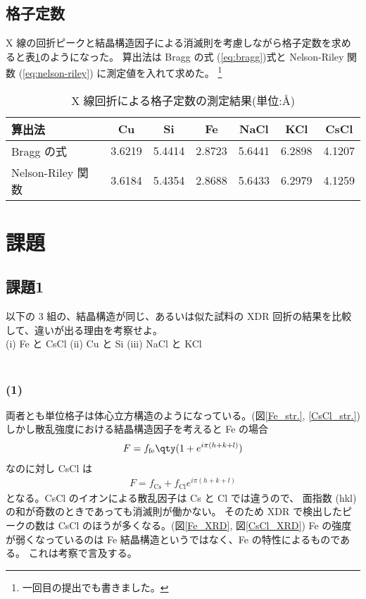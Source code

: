 \documentclass[11pt,dvipdfmx,a4paper]{jsarticle}
\begin{document}
\subsection{格子定数}
X 線の回折ピークと結晶構造因子による消滅則を考慮しながら格子定数を求めると表\ref{table:result}のようになった。
算出法は Bragg の式 (\ref{eq:bragg})式と Nelson-Riley 関数 (\ref{eq:nelson-riley}) に測定値を入れて求めた。
\footnote{一回目の提出でも書きました。}
\begin{table}[H]
	\centering
	\caption{X 線回折による格子定数の測定結果(単位:\AA)} \label{table:result}
	\begin{tabular}[pos]{lcccccc}
		\hline \hline
		算出法 & Cu & Si & Fe & NaCl & KCl & CsCl \\
		\hline
		Bragg の式 & 3.6219 & 5.4414 & 2.8723 & 5.6441 & 6.2898 & 4.1207 \\
		Nelson-Riley 関数 & 3.6184 & 5.4354 & 2.8688 & 5.6433 & 6.2979 & 4.1259\\
		\hline \hline
	\end{tabular}
\end{table}

\section{課題}
\subsection*{課題1}
以下の 3 組の、結晶構造が同じ、あるいは似た試料の XDR 回折の結果を比較して、違いが出る理由を考察せよ。\\
(i) Fe と CsCl \quad (ii) Cu と Si \quad (iii) NaCl と KCl\\ \\

\subsubsection*{(1)}
両者とも単位格子は体心立方構造のようになっている。(図\ref{Fe_str.}, \ref{CsCl_str.})
しかし散乱強度における結晶構造因子を考えると Fe の場合
\begin{align}
	F = f_{\text{fe}}\qty(1+e^{i\pi(h+k+l)})
\end{align}
なのに対し CsCl は
\begin{align}
	F = f_{\text{Cs}}+f_{\text{Cl}}e^{i\pi(h+k+l)}
\end{align}
となる。CsCl のイオンによる散乱因子は Cs と Cl では違うので、
面指数 (hkl) の和が奇数のときであっても消滅則が働かない。
そのため XDR で検出したピークの数は CsCl のほうが多くなる。(図\ref{Fe_XRD}, 図\ref{CsCl_XRD})
Fe の強度が弱くなっているのは Fe 結晶構造というではなく、Fe の特性によるものである。
これは考察で言及する。\\
\end{document}

